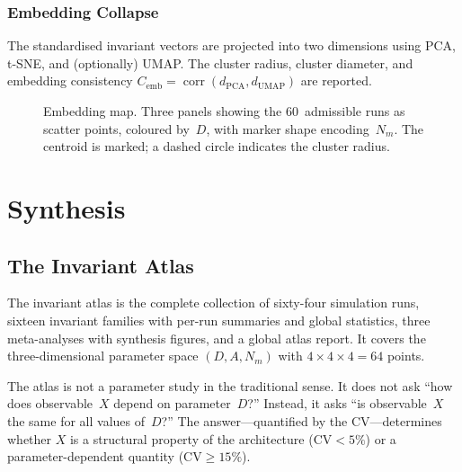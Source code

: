 \documentclass[11pt,twoside,openright]{book}
\theoremstyle{definition}
\theoremstyle{plain}
\theoremstyle{definition}
\theoremstyle{remark}
\newcommand{\CV}{\mathrm{CV}}
\DeclareMathOperator{\corr}{corr}
\begin{document}
\section{Embedding Collapse}\label{sec:meta-embedding}

The standardised invariant vectors are projected into two dimensions using PCA, t-SNE, and (optionally) UMAP. The cluster radius, cluster diameter, and embedding consistency \(C_{\mathrm{emb}} = \corr(d_{\mathrm{PCA}}, d_{\mathrm{UMAP}})\) are reported.

\begin{figure}[ht]
\centering
\caption{Embedding map. Three panels showing the 60~admissible runs as scatter points, coloured by~\(D\), with marker shape encoding~\(N_m\). The centroid is marked; a dashed circle indicates the cluster radius.}
\label{fig:embedding}
\end{figure}


\part{Synthesis}\label{part:synthesis}

\chapter{The Invariant Atlas}\label{ch:atlas}

The invariant atlas is the complete collection of sixty-four simulation runs, sixteen invariant families with per-run summaries and global statistics, three meta-analyses with synthesis figures, and a global atlas report. It covers the three-dimensional parameter space \((D, A, N_m)\) with \(4 \times 4 \times 4 = 64\) points.

The atlas is not a parameter study in the traditional sense. It does not ask ``how does observable~\(X\) depend on parameter~\(D\)?'' Instead, it asks ``is observable~\(X\) the same for all values of~\(D\)?'' The answer---quantified by the CV---determines whether \(X\) is a structural property of the architecture (\(\CV < 5\%\)) or a parameter-dependent quantity (\(\CV \geq 15\%\)).
\end{document}

